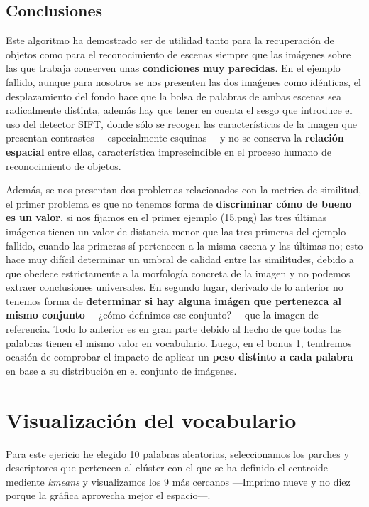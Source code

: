 \documentclass{article}
\begin{document}
\subsection{Conclusiones}

Este algoritmo ha demostrado ser de utilidad tanto para la recuperación de objetos como para el reconocimiento de escenas siempre que las imágenes sobre las que trabaja conserven unas \textbf{condiciones muy parecidas}. En el ejemplo fallido, aunque para nosotros se nos presenten las dos imaǵenes como idénticas, el desplazamiento del fondo hace que la bolsa de palabras de ambas escenas sea radicalmente distinta, además hay que tener en cuenta el sesgo que introduce el uso del detector SIFT, donde sólo se recogen las características de la imagen que presentan contrastes ---especialmente esquinas--- y no se conserva la \textbf{relación espacial} entre ellas, característica imprescindible en el proceso humano de reconocimiento de objetos. 

Además, se nos presentan dos problemas relacionados con la metrica de similitud, el primer problema es que no tenemos forma de \textbf{discriminar cómo de bueno es un valor}, si nos fijamos en el primer ejemplo (15.png) las tres últimas imágenes tienen un valor de distancia menor que las tres primeras del ejemplo fallido, cuando las primeras sí pertenecen a la misma escena y las últimas no; esto hace muy difícil determinar un umbral de calidad entre las similitudes, debido a que obedece estrictamente a la morfología concreta de la imagen y no podemos extraer conclusiones universales. En segundo lugar, derivado de lo anterior no tenemos forma de \textbf{determinar si hay alguna imágen que pertenezca al mismo conjunto} ---¿cómo definimos ese conjunto?--- que la imagen de referencia. Todo lo anterior es en gran parte debido al hecho de que todas las palabras tienen el mismo valor en vocabulario. Luego, en el bonus 1, tendremos ocasión de comprobar el impacto de aplicar un \textbf{peso distinto a cada palabra} en base a su distribución en el conjunto de imágenes.

\section{Visualización del vocabulario}

Para este ejericio he elegido 10 palabras aleatorias, seleccionamos los parches y descriptores que pertencen al clúster con el que se ha definido el centroide mediente \textit{kmeans} y visualizamos los 9 más cercanos ---Imprimo nueve y no diez porque la gráfica aprovecha mejor el espacio---.
\end{document}
